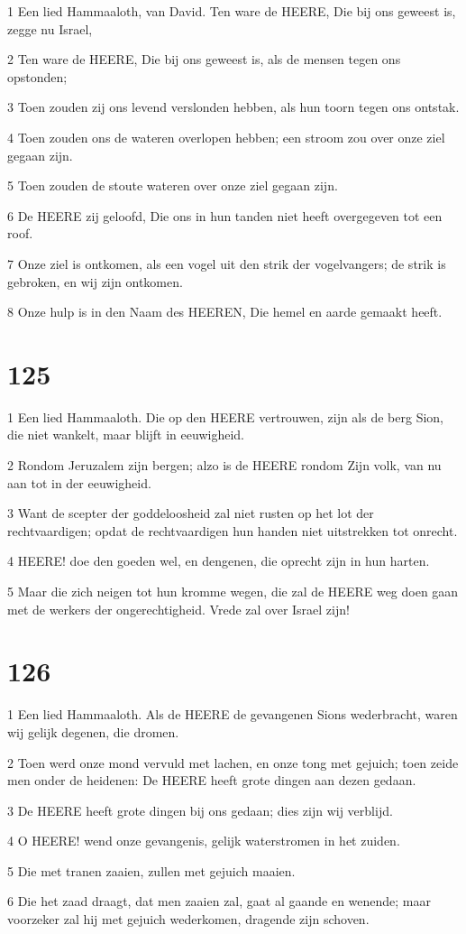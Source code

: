 \par 1 Een lied Hammaaloth, van David. Ten ware de HEERE, Die bij ons geweest is, zegge nu Israel,
\par 2 Ten ware de HEERE, Die bij ons geweest is, als de mensen tegen ons opstonden;
\par 3 Toen zouden zij ons levend verslonden hebben, als hun toorn tegen ons ontstak.
\par 4 Toen zouden ons de wateren overlopen hebben; een stroom zou over onze ziel gegaan zijn.
\par 5 Toen zouden de stoute wateren over onze ziel gegaan zijn.
\par 6 De HEERE zij geloofd, Die ons in hun tanden niet heeft overgegeven tot een roof.
\par 7 Onze ziel is ontkomen, als een vogel uit den strik der vogelvangers; de strik is gebroken, en wij zijn ontkomen.
\par 8 Onze hulp is in den Naam des HEEREN, Die hemel en aarde gemaakt heeft.

\chapter{125}

\par 1 Een lied Hammaaloth. Die op den HEERE vertrouwen, zijn als de berg Sion, die niet wankelt, maar blijft in eeuwigheid.
\par 2 Rondom Jeruzalem zijn bergen; alzo is de HEERE rondom Zijn volk, van nu aan tot in der eeuwigheid.
\par 3 Want de scepter der goddeloosheid zal niet rusten op het lot der rechtvaardigen; opdat de rechtvaardigen hun handen niet uitstrekken tot onrecht.
\par 4 HEERE! doe den goeden wel, en dengenen, die oprecht zijn in hun harten.
\par 5 Maar die zich neigen tot hun kromme wegen, die zal de HEERE weg doen gaan met de werkers der ongerechtigheid. Vrede zal over Israel zijn!

\chapter{126}

\par 1 Een lied Hammaaloth. Als de HEERE de gevangenen Sions wederbracht, waren wij gelijk degenen, die dromen.
\par 2 Toen werd onze mond vervuld met lachen, en onze tong met gejuich; toen zeide men onder de heidenen: De HEERE heeft grote dingen aan dezen gedaan.
\par 3 De HEERE heeft grote dingen bij ons gedaan; dies zijn wij verblijd.
\par 4 O HEERE! wend onze gevangenis, gelijk waterstromen in het zuiden.
\par 5 Die met tranen zaaien, zullen met gejuich maaien.
\par 6 Die het zaad draagt, dat men zaaien zal, gaat al gaande en wenende; maar voorzeker zal hij met gejuich wederkomen, dragende zijn schoven.

